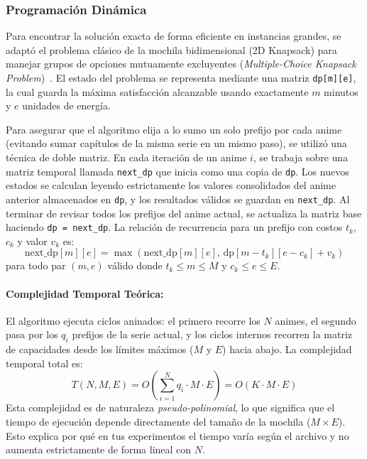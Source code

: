 \subsubsection{Programación Dinámica}

Para encontrar la solución exacta de forma eficiente en instancias grandes, se adaptó el problema clásico de la mochila bidimensional (2D Knapsack) para manejar grupos de opciones mutuamente excluyentes (\textit{Multiple-Choice Knapsack Problem})~\cite{geeks_2d_knapsack}. El estado del problema se representa mediante una matriz \texttt{dp[m][e]}, la cual guarda la máxima satisfacción alcanzable usando exactamente $m$ minutos y $e$ unidades de energía.

Para asegurar que el algoritmo elija a lo sumo un solo prefijo por cada anime (evitando sumar capítulos de la misma serie en un mismo paso), se utilizó una técnica de doble matriz. En cada iteración de un anime $i$, se trabaja sobre una matriz temporal llamada \texttt{next\_dp} que inicia como una copia de \texttt{dp}. Los nuevos estados se calculan leyendo estrictamente los valores consolidados del anime anterior almacenados en \texttt{dp}, y los resultados válidos se guardan en \texttt{next\_dp}. Al terminar de revisar todos los prefijos del anime actual, se actualiza la matriz base haciendo \texttt{dp = next\_dp}. La relación de recurrencia para un prefijo con costos $t_k$, $c_k$ y valor $v_k$ es:
\begin{equation}
\text{next\_dp}[m][e] = \max \left( \text{next\_dp}[m][e],\, \text{dp}[m - t_k][e - c_k] + v_k \right)
\end{equation}
para todo par $(m, e)$ válido donde $t_k \le m \le M$ y $c_k \le e \le E$.

\paragraph{Complejidad Temporal Teórica:}
El algoritmo ejecuta ciclos aninados: el primero recorre los $N$ animes, el segundo pasa por los $q_i$ prefijos de la serie actual, y los ciclos internos recorren la matriz de capacidades desde los límites máximos ($M$ y $E$) hacia abajo. La complejidad temporal total es:
\begin{equation}
T(N, M, E) = O\left(\sum_{i=1}^{N} q_i \cdot M \cdot E\right) = O(K \cdot M \cdot E)
\end{equation}
Esta complejidad es de naturaleza \textit{pseudo-polinomial}, lo que significa que el tiempo de ejecución depende directamente del tamaño de la mochila ($M \times E$). Esto explica por qué en tus experimentos el tiempo varía según el archivo y no aumenta estrictamente de forma lineal con $N$.

